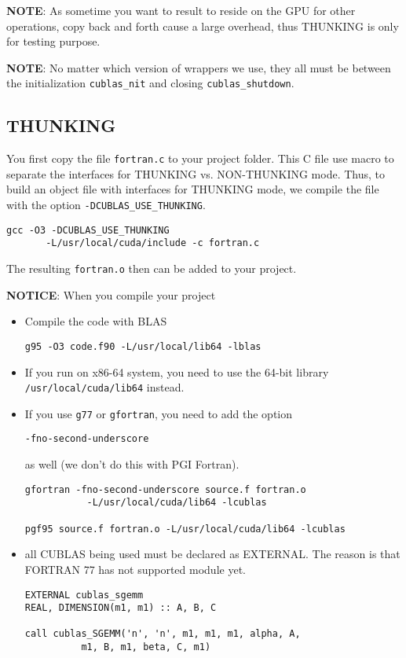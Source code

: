 {\bf NOTE}: As sometime you want to result to reside on the GPU for
other operations, copy back and forth cause a large overhead, thus
THUNKING  is only for testing purpose.

{\bf NOTE}: No matter which version of wrappers we use, they all must
be between the initialization \verb!cublas_nit! and closing
\verb!cublas_shutdown!.

\subsection{THUNKING}
\label{sec:thunking}

You first copy the file \verb!fortran.c! to your project folder. This
C file use macro to separate the interfaces for THUNKING
vs. NON-THUNKING mode.  Thus, to build an object file with interfaces
for THUNKING mode, we compile the file with the option
\verb!-DCUBLAS_USE_THUNKING!.

\begin{lstlisting}
gcc -O3 -DCUBLAS_USE_THUNKING 
       -L/usr/local/cuda/include -c fortran.c
\end{lstlisting}
The resulting \verb!fortran.o!  then can be added to your project.

{\bf NOTICE}: When you compile your project
\begin{itemize}
\item Compile the code with BLAS
\begin{verbatim}
g95 -O3 code.f90 -L/usr/local/lib64 -lblas
\end{verbatim}

\item If you run on x86-64 system, you need to use the 64-bit library
  \verb!/usr/local/cuda/lib64! instead.

\item If you use \verb!g77! or \verb!gfortran!, you need to add the
  option
\begin{verbatim}
-fno-second-underscore
\end{verbatim}
as well (we don't do this with PGI Fortran).
\begin{verbatim}
gfortran -fno-second-underscore source.f fortran.o
           -L/usr/local/cuda/lib64 -lcublas

pgf95 source.f fortran.o -L/usr/local/cuda/lib64 -lcublas
\end{verbatim}

\item all CUBLAS being used must be declared as EXTERNAL. The reason
  is that FORTRAN 77 has not supported module yet.
\begin{lstlisting}
EXTERNAL cublas_sgemm
REAL, DIMENSION(m1, m1) :: A, B, C

call cublas_SGEMM('n', 'n', m1, m1, m1, alpha, A, 
          m1, B, m1, beta, C, m1)
\end{lstlisting}

\end{itemize}

